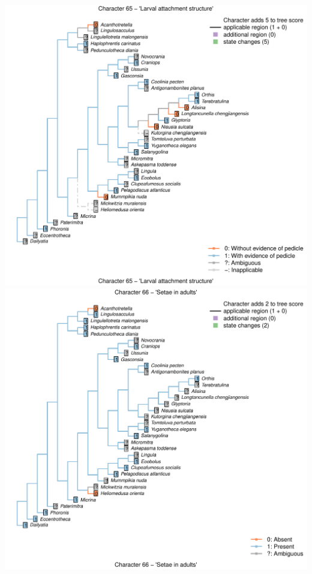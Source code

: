 \documentclass[]{book}
\theoremstyle{definition}
\theoremstyle{definition}
\theoremstyle{definition}
\theoremstyle{remark}
\begin{document}
\includegraphics{Brachiopod_phylogeny_files/figure-latex/unnamed-chunk-4-65.pdf}
\includegraphics{Brachiopod_phylogeny_files/figure-latex/unnamed-chunk-4-66.pdf}
\end{document}
